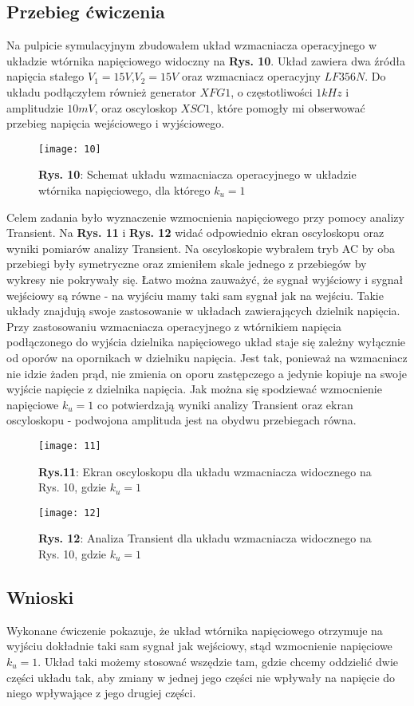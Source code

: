 \documentclass[11pt]{article}
\begin{document}
\subsection{Przebieg ćwiczenia}
Na pulpicie symulacyjnym zbudowałem układ wzmacniacza operacyjnego w układzie wtórnika napięciowego widoczny na \textbf{Rys. 10}. Układ zawiera dwa źródła napięcia stałego $V_1=15V$,$V_2=15V$ oraz wzmacniacz operacyjny $LF356N$. Do układu podłączyłem również generator $XFG1$, o częstotliwości $1kHz$ i amplitudzie $10mV$, oraz oscyloskop $XSC1$, które pomogły mi obserwować przebieg napięcia wejściowego i wyjściowego.
\begin{figure}[H]
\centering
\texttt{[image: 10]}
\caption*{\textbf{Rys. 10}: Schemat układu wzmacniacza operacyjnego w układzie wtórnika napięciowego, dla którego $k_u=1$}
\end{figure}
\noindent Celem zadania było wyznaczenie wzmocnienia napięciowego przy pomocy analizy Transient. Na \textbf{Rys. 11} i \textbf{Rys. 12} widać odpowiednio ekran oscyloskopu oraz wyniki pomiarów analizy Transient. Na oscyloskopie wybrałem tryb AC by oba przebiegi były symetryczne oraz zmieniłem skale jednego z przebiegów by wykresy nie pokrywały się. Łatwo można zauważyć, że sygnał wyjściowy i sygnał wejściowy są równe - na wyjściu mamy taki sam sygnał jak na wejściu. Takie układy znajdują swoje zastosowanie w układach zawierających dzielnik napięcia. Przy zastosowaniu wzmacniacza operacyjnego z wtórnikiem 
napięcia podłączonego do wyjścia dzielnika napięciowego układ staje się zależny wyłącznie od oporów na opornikach w dzielniku napięcia. Jest tak, ponieważ na wzmacniacz nie idzie żaden prąd, nie zmienia on oporu zastępczego a jedynie kopiuje na swoje wyjście napięcie z dzielnika napięcia. Jak można się spodziewać 
wzmocnienie napięciowe $k_u=1$ co potwierdzają wyniki analizy Transient oraz ekran oscyloskopu - podwojona amplituda jest na obydwu przebiegach równa.
\begin{figure}[H]
\centering
\texttt{[image: 11]}
\caption*{\textbf{Rys.11}: Ekran oscyloskopu dla układu wzmacniacza widocznego na Rys. 10, gdzie $k_u=1$}
\end{figure}
\begin{figure}[H]
\centering
\texttt{[image: 12]}
\caption*{\textbf{Rys. 12}: Analiza Transient dla układu wzmacniacza widocznego na Rys. 10, gdzie $k_u=1$ }
\end{figure}
\subsection{Wnioski}
Wykonane ćwiczenie pokazuje, że układ wtórnika napięciowego otrzymuje na wyjściu dokładnie taki sam sygnał jak wejściowy, stąd wzmocnienie napięciowe $k_u=1$. Układ taki możemy stosować wszędzie tam, gdzie chcemy oddzielić dwie części układu tak, aby zmiany w jednej jego części nie wpływały na napięcie do niego
wpływające z jego drugiej części.
\end{document}
